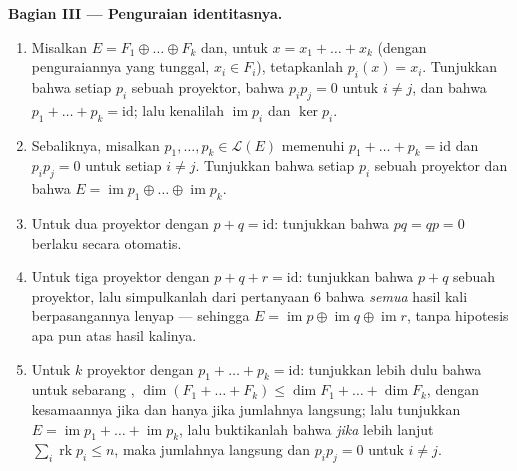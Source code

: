 \begin{problem}
\medskip
\noindent\textbf{Bagian III --- Penguraian identitasnya.}
\begin{enumerate}[resume]
  \item Misalkan $E = F_1 \oplus \dots \oplus F_k$ dan, untuk $x = x_1 +
        \dots + x_k$ (dengan penguraiannya yang tunggal, $x_i \in F_i$), tetapkanlah
        $p_i(x) = x_i$. Tunjukkan bahwa setiap $p_i$ sebuah proyektor, bahwa
        $p_i p_j = 0$ untuk $i \neq j$, dan bahwa $p_1 + \dots + p_k
        = \mathrm{id}$; lalu kenalilah $\operatorname{im} p_i$ dan
        $\ker p_i$.
  \item Sebaliknya, misalkan $p_1, \dots, p_k \in \mathcal{L}(E)$
        memenuhi $p_1 + \dots + p_k = \mathrm{id}$ dan $p_i p_j =
        0$ untuk setiap $i \neq j$. Tunjukkan bahwa setiap $p_i$ sebuah
        proyektor dan bahwa $E = \operatorname{im} p_1 \oplus
        \dots \oplus \operatorname{im} p_k$.
  \item Untuk dua proyektor dengan $p + q = \mathrm{id}$: tunjukkan bahwa $pq
        = qp = 0$ berlaku secara otomatis.
  \item Untuk tiga proyektor dengan $p + q + r = \mathrm{id}$: tunjukkan
        bahwa $p + q$ sebuah proyektor, lalu simpulkanlah dari pertanyaan 6
        bahwa \emph{semua} hasil kali berpasangannya lenyap --- sehingga $E =
        \operatorname{im} p \oplus \operatorname{im} q \oplus
        \operatorname{im} r$, tanpa hipotesis apa pun atas hasil kalinya.
  \item Untuk $k$ proyektor dengan $p_1 + \dots + p_k =
        \mathrm{id}$: tunjukkan lebih dulu bahwa untuk sebarang , $\dim
        (F_1 + \dots + F_k) \leq \dim F_1 + \dots + \dim F_k$,
        dengan kesamaannya jika dan hanya jika jumlahnya langsung; lalu
        tunjukkan $E = \operatorname{im} p_1 + \dots +
        \operatorname{im} p_k$, lalu buktikanlah bahwa \emph{jika}
        lebih lanjut $\sum_i \operatorname{rk} p_i \leq n$, maka jumlahnya
        langsung dan $p_i p_j = 0$ untuk $i \neq j$.
\end{enumerate}


\end{problem}
